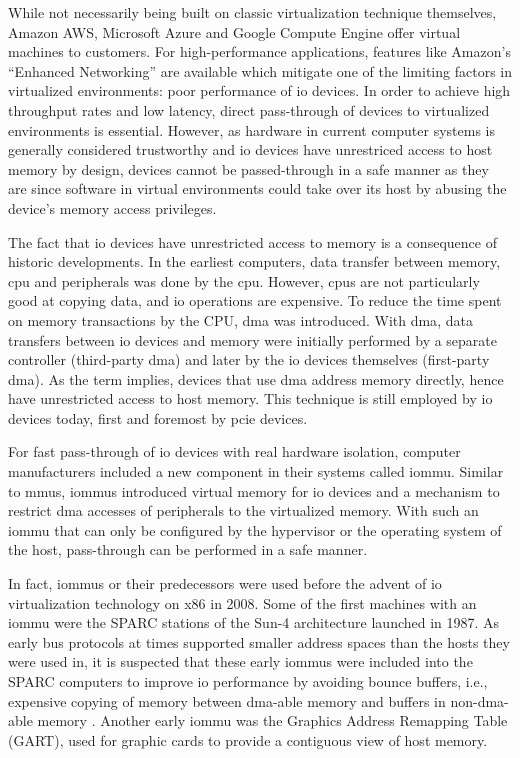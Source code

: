 While not necessarily being built on classic virtualization technique
themselves, Amazon AWS, Microsoft Azure and Google Compute Engine offer virtual
machines to customers. For high-performance applications, features like Amazon's
``Enhanced Networking'' are available which mitigate one of the limiting factors
in virtualized environments: poor performance of \acs{io} devices. In order to
achieve high throughput rates and low latency, direct pass-through of devices to
virtualized environments is essential. However, as hardware in current computer
systems is generally considered trustworthy and \ac{io} devices have unrestriced
access to host memory by design, devices cannot be passed-through in a safe
manner as they are since software in virtual environments could take over its
host by abusing the device's memory access privileges.

The fact that \ac{io} devices have unrestricted access to memory is a
consequence of historic developments. In the earliest computers, data transfer
between memory, \acs{cpu} and peripherals was done by the \ac{cpu}. However,
\acp{cpu} are not particularly good at copying data, and \ac{io} operations are
expensive. To reduce the time spent on memory transactions by the CPU, \ac{dma}
was introduced. With \ac{dma}, data transfers between \ac{io} devices and memory
were initially performed by a separate controller (third-party \ac{dma}) and
later by the \ac{io} devices themselves (first-party \ac{dma}). As the term
implies, devices that use \ac{dma} address memory directly, hence have
unrestricted access to host memory. This technique is still employed by \ac{io}
devices today, first and foremost by \acs{pcie} devices.

For fast pass-through of \ac{io} devices with real hardware isolation, computer
manufacturers included a new component in their systems called \acf{iommu}.
Similar to \acp{mmu}, \acp{iommu} introduced virtual memory for \ac{io} devices
and a mechanism to restrict \ac{dma} accesses of peripherals to the virtualized
memory. With such an \ac{iommu} that can only be configured by the hypervisor
or the operating system of the host, pass-through can be performed in a safe
manner.

In fact, \acp{iommu} or their predecessors were used before the advent of
\ac{io} virtualization technology on x86 in 2008. Some of the first machines
with an \ac{iommu} were the SPARC stations of the Sun-4 architecture launched in
1987. As early bus protocols at times supported smaller address spaces than the
hosts they were used in, it is suspected that these early \acp{iommu} were
included into the SPARC computers to improve \ac{io} performance by avoiding
bounce buffers, i.e., expensive copying of memory between \ac{dma}-able memory
and buffers in non-\ac{dma}-able memory
\cite[pp.~28~ff.]{rothwell2018exploitation}. Another early \ac{iommu} was the
Graphics Address Remapping Table (GART), used for graphic cards to provide a
contiguous view of host memory.

